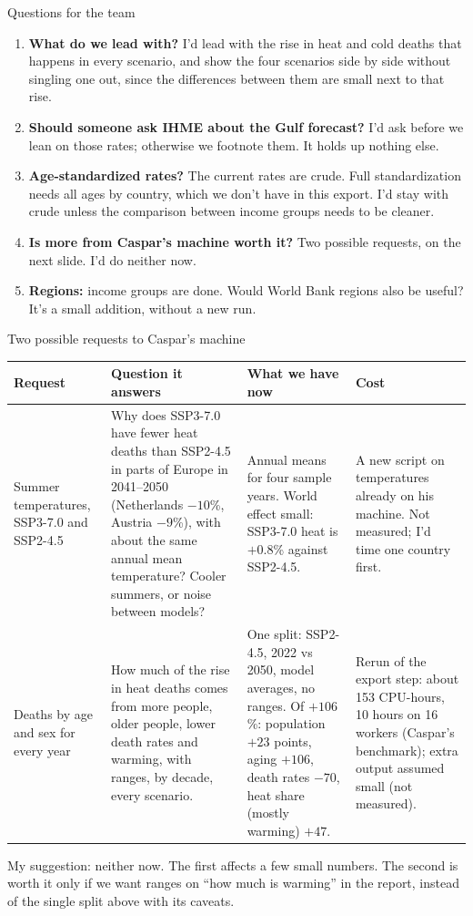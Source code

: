 \documentclass[aspectratio=169,11pt]{beamer}
\begin{document}
\begin{frame}{Questions for the team}
  \small
  \begin{enumerate}
    \item \textbf{What do we lead with?} I'd lead with the rise in heat and cold deaths that happens in every scenario, and show the four scenarios side by side without singling one out, since the differences between them are small next to that rise.
    \item \textbf{Should someone ask IHME about the Gulf forecast?} I'd ask before we lean on those rates; otherwise we footnote them. It holds up nothing else.
    \item \textbf{Age-standardized rates?} The current rates are crude. Full standardization needs all ages by country, which we don't have in this export. I'd stay with crude unless the comparison between income groups needs to be cleaner.
    \item \textbf{Is more from Caspar's machine worth it?} Two possible requests, on the next slide. I'd do neither now.
    \item \textbf{Regions:} income groups are done. Would World Bank regions also be useful? It's a small addition, without a new run.
  \end{enumerate}
\end{frame}

\begin{frame}{Two possible requests to Caspar's machine}
  \scriptsize
  \centering
  \renewcommand{\arraystretch}{1.0}
  \begin{tabular}{L{0.12\textwidth}L{0.30\textwidth}L{0.25\textwidth}L{0.20\textwidth}}
    \toprule
    Request & Question it answers & What we have now & Cost \\
    \midrule
    Summer temperatures, SSP3-7.0 and SSP2-4.5 &
    Why does SSP3-7.0 have fewer heat deaths than SSP2-4.5 in parts of Europe in 2041--2050 (Netherlands $-10$\%, Austria $-9$\%), with about the same annual mean temperature? Cooler summers, or noise between models? &
    Annual means for four sample years. World effect small: SSP3-7.0 heat is $+0.8$\% against SSP2-4.5. &
    A new script on temperatures already on his machine. Not measured; I'd time one country first. \\
    \midrule
    Deaths by age and sex for every year &
    How much of the rise in heat deaths comes from more people, older people, lower death rates and warming, with ranges, by decade, every scenario. &
    One split: SSP2-4.5, 2022 vs 2050, model averages, no ranges. Of $+106$\%: population $+23$ points, aging $+106$, death rates $-70$, heat share (mostly warming) $+47$. &
    Rerun of the export step: about 153 CPU-hours, 10 hours on 16 workers (Caspar's benchmark); extra output assumed small (not measured). \\
    \bottomrule
  \end{tabular}

  \smallskip
  \raggedright\scriptsize
  My suggestion: neither now. The first affects a few small numbers. The second is worth it only if we want ranges on ``how much is warming'' in the report, instead of the single split above with its caveats.
\end{frame}
\end{document}

